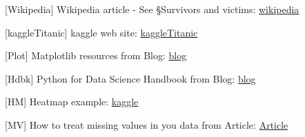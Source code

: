\documentclass[11pt]{article}
\begin{document}
{[}Wikipedia{]} Wikipedia article - See §Survivors and victims:
\href{https://en.wikipedia.org/wiki/RMS_Titanic}{wikipedia}

{[}kaggleTitanic{]} kaggle web site:
\href{https://www.kaggle.com/c/titanic/data}{kaggleTitanic}

{[}Plot{]} Matplotlib resources from Blog:
\href{http://www.datasciencecentral.com/profiles/blogs/matplotlib-cheat-sheet}{blog}

{[}Hdbk{]} Python for Data Science Handbook from Blog:
\href{http://www.datasciencecentral.com/profiles/blogs/book-python-data-science-handbook?utm_content=buffer09a5c\&utm_medium=social\&utm_source=twitter.com\&utm_campaign=buffer}{blog}

{[}HM{]} Heatmap example:
\href{https://www.kaggle.com/arthurtok/introduction-to-ensembling-stacking-in-python}{kaggle}

{[}MV{]} How to treat missing values in you data from Article:
\href{https://clevertap.com/blog/how-to-treat-missing-values-in-your-data-part-i/}{Article}


    
    
    
    
\end{document}
